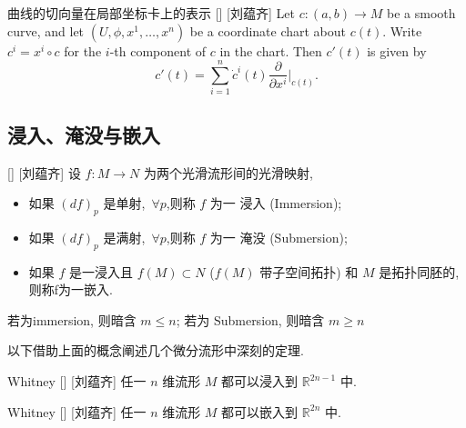 \documentclass[UTF8]{ctexart}
\begin{document}
        \begin{ppt}
            []
            {曲线的切向量在局部坐标卡上的表示}
            []
            [刘蕴齐]
            Let \( c: (a,b) \to M \) be a smooth curve, 
            and let \( (U, \phi, x^1, \dots, x^n) \) be a coordinate chart about \( c(t) \). 
            Write \( c^i = x^i \circ c \) for the \( i \)-th component of \( c \) in the chart. Then \( c'(t) \) is given by
            \[
            c'(t) = \sum_{i=1}^{n} \dot{c}^i(t) \frac{\partial}{\partial x^i} \bigg|_{c(t)}.
            \]
        \end{ppt}
    
    \subsection{浸入、淹没与嵌入}
    
        \begin{dfn}
            []
            {}
            []
            [刘蕴齐]
            设 \(f: M \to N\) 为两个光滑流形间的光滑映射, 
            \begin{itemize}
                \item 如果 \( {(df)}_p\)  是单射,\,  \(\forall p\),则称 \(f\)  为一 浸入 (Immersion);
                \item 如果 \( {(df)}_p\)  是满射,\,  \(\forall p\),则称 \(f\)  为一 淹没 (Submersion);
                \item 如果 \(f\) 是一浸入且 \(f(M) \subset N\)  (\(f(M)\) 带子空间拓扑) 和 \(M\) 是拓扑同胚的, 则称f为一嵌入. 
            \end{itemize}
        \end{dfn}

        \begin{rmk}
            []
            若为immersion, 则暗含 \(m \leq n\); 若为 Submersion, 则暗含 \(m \geq n\) 
        \end{rmk}

        以下借助上面的概念阐述几个微分流形中深刻的定理. 

        \begin{thm}
            []
            {Whitney}
            []
            [刘蕴齐]
            任一 \(n\) 维流形 \(M\) 都可以浸入到 \(\mathbb{R}^{2n-1}\) 中. 
        \end{thm}

        \begin{thm}
            []
            {Whitney}
            []
            [刘蕴齐]
            任一 \(n\) 维流形 \(M\) 都可以嵌入到 \(\mathbb{R}^{2n}\) 中. 
        \end{thm}
\end{document}
